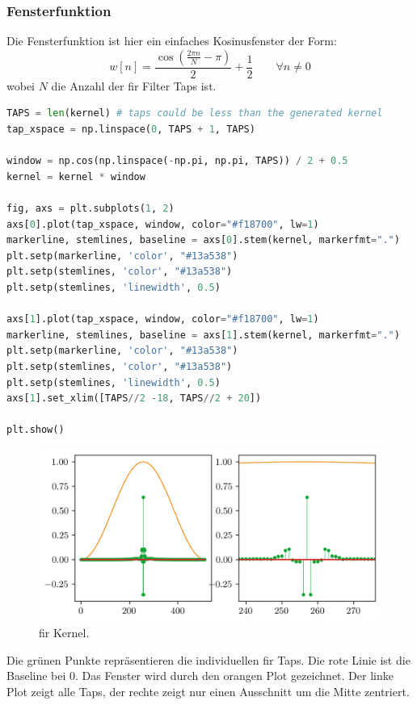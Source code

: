 \hypertarget{fensterfunktion}{%
\subsubsection{Fensterfunktion}\label{fensterfunktion}}

Die Fensterfunktion ist hier ein einfaches Kosinusfenster der Form:
\[w[n] = \frac{\cos \left( \frac{2\pi n}{N}-\pi \right)}{2} + \frac{1}{2} \qquad \forall n \neq 0\]
wobei \(N\) die Anzahl der \gls{fir} Filter Taps ist.

\begin{lstlisting}[language=Python]
TAPS = len(kernel) # taps could be less than the generated kernel
tap_xspace = np.linspace(0, TAPS + 1, TAPS)

window = np.cos(np.linspace(-np.pi, np.pi, TAPS)) / 2 + 0.5
kernel = kernel * window

fig, axs = plt.subplots(1, 2)
axs[0].plot(tap_xspace, window, color="#f18700", lw=1)
markerline, stemlines, baseline = axs[0].stem(kernel, markerfmt=".")
plt.setp(markerline, 'color', "#13a538")
plt.setp(stemlines, 'color', "#13a538")
plt.setp(stemlines, 'linewidth', 0.5)

axs[1].plot(tap_xspace, window, color="#f18700", lw=1)
markerline, stemlines, baseline = axs[1].stem(kernel, markerfmt=".")
plt.setp(markerline, 'color', "#13a538")
plt.setp(stemlines, 'color', "#13a538")
plt.setp(stemlines, 'linewidth', 0.5)
axs[1].set_xlim([TAPS//2 -18, TAPS//2 + 20])

plt.show()
\end{lstlisting}

\begin{figure}
  \centering
  \includegraphics{./img/e8b13057814bcb33ac952b78683ccdd09dd04e39.png}
  \caption[\acrshort{fir} Kernel]{\acrshort{fir} Kernel.}
\end{figure}

Die grünen Punkte repräsentieren die individuellen \gls{fir} Taps. Die
rote Linie ist die Baseline bei 0. Das Fenster wird durch den orangen
Plot gezeichnet. Der linke Plot zeigt alle Taps, der rechte zeigt nur
einen Ausschnitt um die Mitte zentriert.

